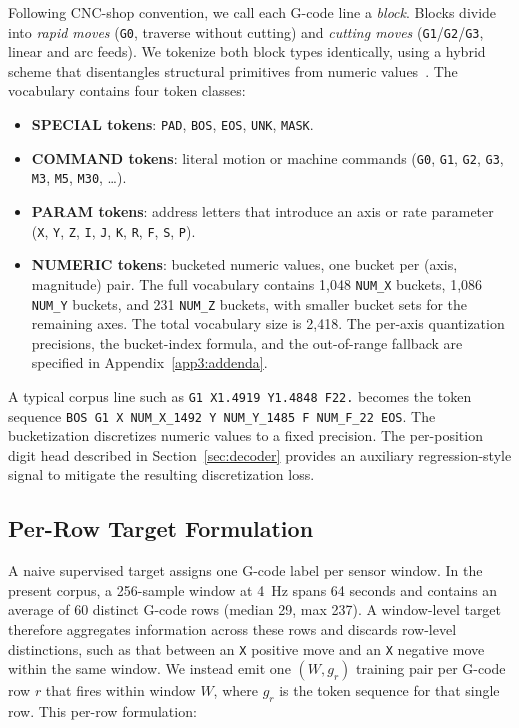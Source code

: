 \documentclass[sensors,article,submit,moreauthors,pdftex]{Definitions/mdpi}
\begin{document}
Following CNC-shop convention, we call each G-code line a \emph{block}. Blocks divide into \emph{rapid moves} (\texttt{G0}, traverse without cutting) and \emph{cutting moves} (\texttt{G1}/\texttt{G2}/\texttt{G3}, linear and arc feeds). We tokenize both block types identically, using a hybrid scheme that disentangles structural primitives from numeric values~\cite{grammar_paper,gcode_foundational}. The vocabulary contains four token classes:
\begin{itemize}
\item \textbf{SPECIAL tokens}: \texttt{PAD}, \texttt{BOS}, \texttt{EOS}, \texttt{UNK}, \texttt{MASK}.
\item \textbf{COMMAND tokens}: literal motion or machine commands (\texttt{G0}, \texttt{G1}, \texttt{G2}, \texttt{G3}, \texttt{M3}, \texttt{M5}, \texttt{M30}, \ldots).
\item \textbf{PARAM tokens}: address letters that introduce an axis or rate parameter (\texttt{X}, \texttt{Y}, \texttt{Z}, \texttt{I}, \texttt{J}, \texttt{K}, \texttt{R}, \texttt{F}, \texttt{S}, \texttt{P}).
\item \textbf{NUMERIC tokens}: bucketed numeric values, one bucket per (axis, magnitude) pair. The full vocabulary contains 1{,}048 \texttt{NUM\_X} buckets, 1{,}086 \texttt{NUM\_Y} buckets, and 231 \texttt{NUM\_Z} buckets, with smaller bucket sets for the remaining axes. The total vocabulary size is 2{,}418. The per-axis quantization precisions, the bucket-index formula, and the out-of-range fallback are specified in Appendix~\ref{app3:addenda}.
\end{itemize}

A typical corpus line such as \texttt{G1 X1.4919 Y1.4848 F22.} becomes the token sequence \texttt{BOS G1 X NUM\_X\_1492 Y NUM\_Y\_1485 F NUM\_F\_22 EOS}. The bucketization discretizes numeric values to a fixed precision. The per-position digit head described in Section~\ref{sec:decoder} provides an auxiliary regression-style signal to mitigate the resulting discretization loss.

\subsection{Per-Row Target Formulation}
\label{sec:per-row}

A naive supervised target assigns one G-code label per sensor window. In the present corpus, a 256-sample window at 4~Hz spans 64 seconds and contains an average of 60 distinct G-code rows (median 29, max 237). A window-level target therefore aggregates information across these rows and discards row-level distinctions, such as that between an \texttt{X} positive move and an \texttt{X} negative move within the same window. We instead emit one $(W, g_r)$ training pair per G-code row $r$ that fires within window $W$, where $g_r$ is the token sequence for that single row. This per-row formulation:
\end{document}
